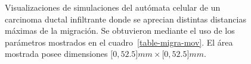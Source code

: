 \begin{figure}[!ht]
\begin{center}
\end{center}\vspace*{-0.6cm}
\caption[Visualizaciones de simulaciones del aut\'omata celular de un carcinoma ductal infiltrante donde se aprecian distintas distancias m\'aximas de la migraci\'on]{Visualizaciones de simulaciones del aut\'omata celular de un carcinoma ductal infiltrante donde se aprecian distintas distancias m\'aximas de la migraci\'on. Se obtuvieron mediante el uso de los par\'ametros mostrados en el cuadro~\ref{table-migra-mov}. El \'area mostrada posee dimensiones $[0,52$.$5]mm \times [0,52$.$5]mm$.}
\label{fig-migra-mov}
\end{figure}

